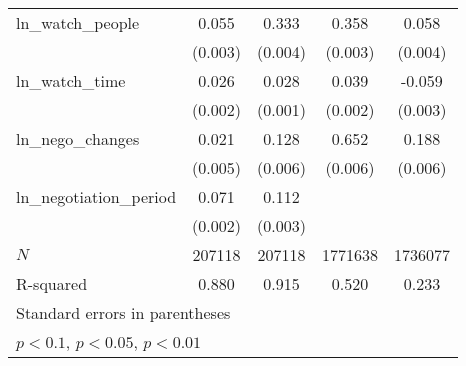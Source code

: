 {\begin{tabular}{l*{4}{c}}
ln\_watch\_people&       0.055\sym{***}&       0.333\sym{***}&       0.358\sym{***}&       0.058\sym{***}\\
            &     (0.003)         &     (0.004)         &     (0.003)         &     (0.004)         \\
\addlinespace
ln\_watch\_time&       0.026\sym{***}&       0.028\sym{***}&       0.039\sym{***}&      -0.059\sym{***}\\
            &     (0.002)         &     (0.001)         &     (0.002)         &     (0.003)         \\
\addlinespace
ln\_nego\_changes&       0.021\sym{***}&       0.128\sym{***}&       0.652\sym{***}&       0.188\sym{***}\\
            &     (0.005)         &     (0.006)         &     (0.006)         &     (0.006)         \\
\addlinespace
ln\_negotiation\_period&       0.071\sym{***}&       0.112\sym{***}&                     &                     \\
            &     (0.002)         &     (0.003)         &                     &                     \\
\midrule
\(N\)       &      207118         &      207118         &     1771638         &     1736077         \\
R-squared   &       0.880         &       0.915         &       0.520         &       0.233         \\
\bottomrule
\multicolumn{5}{l}{\footnotesize Standard errors in parentheses}\\
\multicolumn{5}{l}{\footnotesize \sym{*} \(p<0.1\), \sym{**} \(p<0.05\), \sym{***} \(p<0.01\)}\\
\end{tabular}
}
